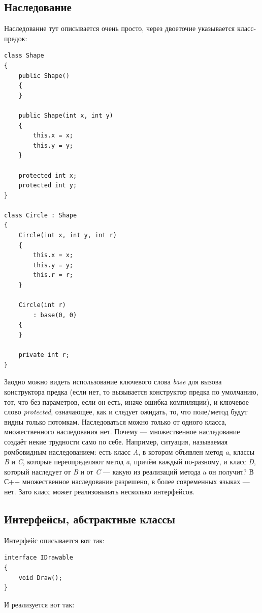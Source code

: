 \documentclass[a5paper]{article}
\begin{document}
\subsection{Наследование}

Наследование тут описывается очень просто, через двоеточие указывается класс-предок:

\begin{verbatim}
class Shape
{
    public Shape() 
    {
    }

    public Shape(int x, int y)
    {
        this.x = x;
        this.y = y;
    }

    protected int x;
    protected int y;
}

class Circle : Shape
{
    Circle(int x, int y, int r)
    {
        this.x = x;
        this.y = y;
        this.r = r;
    }

    Circle(int r)
        : base(0, 0)
    {
    }

    private int r;
}
\end{verbatim}

Заодно можно видеть использование ключевого слова \textit{base} для вызова конструктора предка (если нет, то вызывается конструктор предка по умолчанию, тот, что без параметров, если он есть, иначе ошибка компиляции), и ключевое слово \textit{protected}, означающее, как и следует ожидать, то, что поле/метод будут видны только потомкам. Наследоваться можно только от одного класса, множественного наследования нет. Почему --- множественное наследование создаёт некие трудности само по себе. Например, ситуация, называемая ромбовидным наследованием: есть класс \textit{A}, в котором объявлен метод \textit{a}, классы \textit{B} и \textit{C}, которые переопределяют метод \textit{a}, причём каждый по-разному, и класс \textit{D}, который наследует от \textit{B} и от \textit{C} --- какую из реализаций метода a он получит? В С++ множественное наследование разрешено, в более современных языках --- нет. Зато класс может реализовывать несколько интерфейсов.

\subsection{Интерфейсы, абстрактные классы}

Интерфейс описывается вот так:

\begin{verbatim}
interface IDrawable
{
    void Draw();
}
\end{verbatim}

И реализуется вот так:
\end{document}
